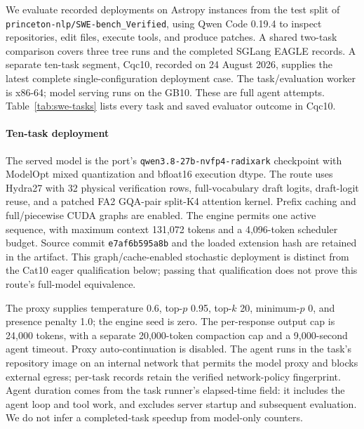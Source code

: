 We evaluate recorded deployments on Astropy instances from the test split of \texttt{princeton-nlp/SWE-bench\_Verified}, using Qwen Code 0.19.4 to inspect repositories, edit files, execute tools, and produce patches. A shared two-task comparison covers three tree runs and the completed SGLang EAGLE records. A separate ten-task segment, Cqc10, recorded on 24 August 2026, supplies the latest complete single-configuration deployment case. The task/evaluation worker is x86-64; model serving runs on the GB10. These are full agent attempts. Table~\ref{tab:swe-tasks} lists every task and saved evaluator outcome in Cqc10.

\paragraph{Ten-task deployment}
The served model is the port's \texttt{qwen3.8-27b-nvfp4-radixark} checkpoint with ModelOpt mixed quantization and bfloat16 execution dtype. The route uses Hydra27 with 32 physical verification rows, full-vocabulary draft logits, draft-logit reuse, and a patched FA2 GQA-pair split-K4 attention kernel. Prefix caching and full/piecewise CUDA graphs are enabled. The engine permits one active sequence, with maximum context 131,072 tokens and a 4,096-token scheduler budget. Source commit \texttt{e7af6b595a8b} and the loaded extension hash are retained in the artifact. This graph/cache-enabled stochastic deployment is distinct from the Cat10 eager qualification below; passing that qualification does not prove this route's full-model equivalence.

The proxy supplies temperature 0.6, top-$p$ 0.95, top-$k$ 20, minimum-$p$ 0, and presence penalty 1.0; the engine seed is zero. The per-response output cap is 24,000 tokens, with a separate 20,000-token compaction cap and a 9,000-second agent timeout. Proxy auto-continuation is disabled. The agent runs in the task's repository image on an internal network that permits the model proxy and blocks external egress; per-task records retain the verified network-policy fingerprint. Agent duration comes from the task runner's elapsed-time field: it includes the agent loop and tool work, and excludes server startup and subsequent evaluation. We do not infer a completed-task speedup from model-only counters.


